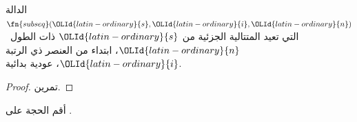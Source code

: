 \documentclass[../../../include/open-logic-section]{subfiles}
\begin{document}
\begin{prop}
  الدالة $\fn{subseq}(\OLId{latin-ordinary}{s},\OLId{latin-ordinary}{i},\OLId{latin-ordinary}{n})$ التي تعيد المتتالية الجزئية من $\OLId{latin-ordinary}{s}$ ذات
  الطول~$\OLId{latin-ordinary}{n}$، ابتداء من العنصر ذي الرتبة $\OLId{latin-ordinary}{i}$، عودية بدائية.
\end{prop}

\begin{proof}
  تمرين.
\end{proof}

\begin{prob}
  أقم الحجة على .
\end{prob}
  
\end{document}
